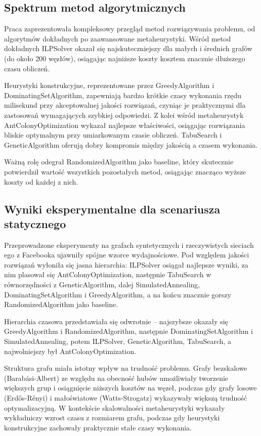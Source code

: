 \subsection{Spektrum metod algorytmicznych}

Praca zaprezentowała kompleksowy przegląd metod rozwiązywania problemu, od algorytmów dokładnych po zaawansowane metaheurystyki. Wśród metod dokładnych ILPSolver okazał się najskuteczniejszy dla małych i średnich grafów (do około 200 węzłów), osiągając najniższe koszty kosztem znacznie dłuższego czasu obliczeń.

Heurystyki konstrukcyjne, reprezentowane przez GreedyAlgorithm i DominatingSetAlgorithm, zapewniają bardzo krótkie czasy wykonania rzędu milisekund przy akceptowalnej jakości rozwiązań, czyniąc je praktycznymi dla zastosowań wymagających szybkiej odpowiedzi. Z kolei wśród metaheurystyk AntColonyOptimization wykazał najlepsze właściwości, osiągając rozwiązania bliskie optymalnym przy umiarkowanym czasie obliczeń. TabuSearch i GeneticAlgorithm oferują dobry kompromis między jakością a czasem wykonania.

Ważną rolę odegrał RandomizedAlgorithm jako baseline, który skutecznie potwierdził wartość wszystkich pozostałych metod, osiągając znacząco wyższe koszty od każdej z nich.

\subsection{Wyniki eksperymentalne dla scenariusza statycznego}

Przeprowadzone eksperymenty na grafach syntetycznych i rzeczywistych sieciach ego z Facebooka ujawniły spójne wzorce wydajnościowe. Pod względem jakości rozwiązań wyłoniła się jasna hierarchia: ILPSolver osiągał najlepsze wyniki, za nim plasował się AntColonyOptimization, następnie TabuSearch w równorzędności z GeneticAlgorithm, dalej SimulatedAnnealing, DominatingSetAlgorithm i GreedyAlgorithm, a na końcu znacznie gorszy RandomizedAlgorithm jako baseline.

Hierarchia czasowa przedstawiała się odwrotnie -- najszybsze okazały się GreedyAlgorithm i RandomizedAlgorithm, następnie DominatingSetAlgorithm i SimulatedAnnealing, potem ILPSolver, GeneticAlgorithm, TabuSearch, a najwolniejszy był AntColonyOptimization.

Struktura grafu miała istotny wpływ na trudność problemu. Grafy bezskalowe (Barabási-Albert) ze względu na obecność hubów umożliwiały tworzenie większych grup i osiągnięcie niższych kosztów na węzeł, podczas gdy grafy losowe (Erdős-Rényi) i małoświatowe (Watts-Strogatz) wykazywały większą trudność optymalizacyjną. W kontekście skalowalności metaheurystyki wykazały wykładniczy wzrost czasu z rozmiarem grafu, podczas gdy heurystyki konstrukcyjne zachowały praktycznie stałe czasy wykonania.

